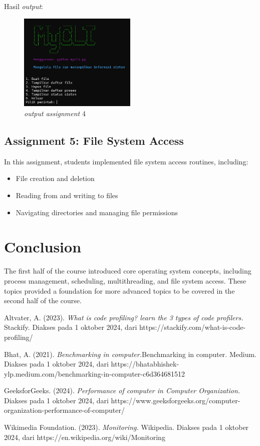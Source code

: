 \documentclass[12pt]{article}
\begin{document}
\par Hasil \textit{output}:
\begin{figure}[h]
    \centering
    \includegraphics[width=0.5\textwidth] {asset/output_assignment4_group2.png} 
    \caption{\textit{output assignment} 4}
    \label{fig:output_assignment_4}
\end{figure}

\subsection{Assignment 5: File System Access}
In this assignment, students implemented file system access routines, including:
\begin{itemize}
    \item File creation and deletion
    \item Reading from and writing to files
    \item Navigating directories and managing file permissions
\end{itemize}

\section{Conclusion}
The first half of the course introduced core operating system concepts, including process management, scheduling, multithreading, and file system access. These topics provided a foundation for more advanced topics to be covered in the second half of the course.

\begin{thebibliography}{3}
    Altvater, A. (2023). \textit{What is code profiling? learn the 3 types of code profilers.} Stackify. Diakses pada 1 oktober 2024, dari https://stackify.com/what-is-code-profiling/ 
    
    Bhat, A. (2021). \textit{Benchmarking in computer.}Benchmarking in computer. Medium. Diakses pada 1 oktober 2024, dari https://bhatabhishek-ylp.medium.com/benchmarking-in-computer-c6d364681512 

    GeeksforGeeks. (2024). \textit{Performance of computer in Computer Organization.} Diakses pada 1 oktober 2024, dari https://www.geeksforgeeks.org/computer-organization-performance-of-computer/ 

    Wikimedia Foundation. (2023). \textit{Monitoring.} Wikipedia. Diakses pada 1 oktober 2024, dari https://en.wikipedia.org/wiki/Monitoring 
\end{thebibliography}
\end{document}
